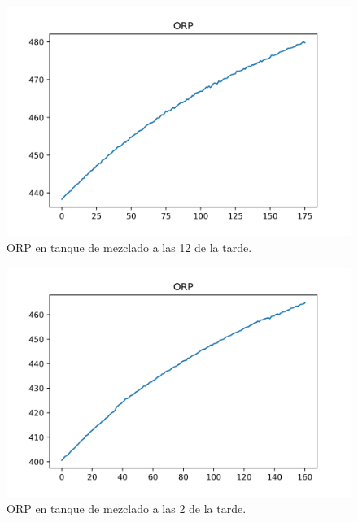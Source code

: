 \begin{figure}[h]
	\centering
	\includegraphics[scale=0.7]{imgss158.png}
	\caption{ORP en tanque de mezclado a las 12 de la tarde.}
	\label{fig:figura1000_5}
\end{figure}

\clearpage

\begin{figure}[h]
	\centering
	\includegraphics[scale=0.7]{imgss159.png}
	\caption{ORP en tanque de mezclado a las 2 de la tarde.}
	\label{fig:figura1000_6}
\end{figure}

